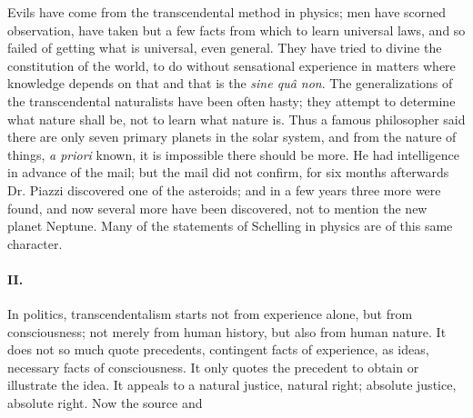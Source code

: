 \documentclass[12pt]{article}
\begin{document}
Evils have come from the transcendental method in 
physics; men have scorned observation, have taken but 
a few facts from which to learn universal laws, and so 
failed of getting what is universal, even general. They 
have tried to divine the constitution of the world, to do 
without sensational experience in matters where knowledge depends on that and that is the \emph{sine qu\^{a} non}. The 
generalizations of the transcendental naturalists have 
been often hasty; they attempt to determine what nature shall be, not to learn what nature is. Thus a famous philosopher said there are only seven primary 
planets in the solar system, and from the nature of 
things, \emph{a priori} known, it is impossible there should be 
more. He had intelligence in advance of the mail; but 
the mail did not confirm, for six months afterwards Dr. 
Piazzi discovered one of the asteroids; and in a few 
years three more were found, and now several more 
have been discovered, not to mention the new planet 
Neptune. Many of the statements of Schelling in 
physics are of this same character. 

\paragraph{II.} In politics, transcendentalism starts not from experience alone, but from consciousness; not merely from 
human history, but also from human nature. It does 
not so much quote precedents, contingent facts of experience, as ideas, necessary facts of consciousness. It 
only quotes the precedent to obtain or illustrate the 
idea. It appeals to a natural justice, natural right; 
absolute justice, absolute right. Now the source and 



\end{document}
